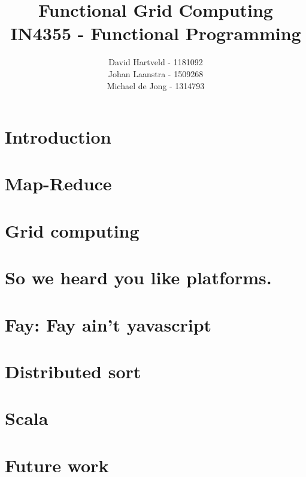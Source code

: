 \documentclass{article}
\title{Functional Grid Computing\\
IN4355 - Functional Programming}
\author{David Hartveld - 1181092 \\
		Johan Laanstra - 1509268 \\
		Michael de Jong - 1314793}
\begin{document}
\maketitle

\section{Introduction}
	
		
\section{Map-Reduce}
	
	
\section{Grid computing}
	
	
\section{So we heard you like platforms.}
	
	
\section{Fay: Fay ain't yavascript}
	
	
\section{Distributed sort}
	
	
\section{Scala}
	
	
	
\section{Future work}
	
	


\end{document}
